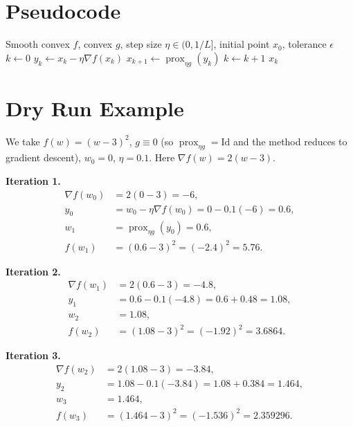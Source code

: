 \documentclass[11pt]{article}
\begin{document}
\section*{Pseudocode}

\begin{algorithm}[H]
\caption{Proximal Gradient Method}
\begin{algorithmic}[1]
\Require Smooth convex $f$, convex $g$, step size $\eta \in (0, 1/L]$, initial point $x_0$, tolerance $\epsilon$
\State $k \gets 0$
\Repeat
    \State $y_k \gets x_k - \eta \nabla f(x_k)$ 
    \State $x_{k+1} \gets \operatorname{prox}_{\eta g}(y_k)$ 
    \State $k \gets k+1$
\State \Return $x_k$
\end{algorithmic}
\end{algorithm}

\section*{Dry Run Example}

We take $f(w) = (w-3)^2$, $g \equiv 0$ (so $\operatorname{prox}_{\eta g} = \mathrm{Id}$ and the method reduces to gradient descent), $w_0 = 0$, $\eta = 0.1$. Here $\nabla f(w) = 2(w-3)$.

\textbf{Iteration 1.}
\begin{align*}
\nabla f(w_0) &= 2(0-3) = -6,\\
y_0 &= w_0 - \eta\nabla f(w_0) = 0 - 0.1(-6) = 0.6,\\
w_1 &= \operatorname{prox}_{\eta g}(y_0) = 0.6,\\
f(w_1) &= (0.6-3)^2 = (-2.4)^2 = 5.76.
\end{align*}

\textbf{Iteration 2.}
\begin{align*}
\nabla f(w_1) &= 2(0.6-3) = -4.8,\\
y_1 &= 0.6 - 0.1(-4.8) = 0.6 + 0.48 = 1.08,\\
w_2 &= 1.08,\\
f(w_2) &= (1.08-3)^2 = (-1.92)^2 = 3.6864.
\end{align*}

\textbf{Iteration 3.}
\begin{align*}
\nabla f(w_2) &= 2(1.08-3) = -3.84,\\
y_2 &= 1.08 - 0.1(-3.84) = 1.08 + 0.384 = 1.464,\\
w_3 &= 1.464,\\
f(w_3) &= (1.464-3)^2 = (-1.536)^2 = 2.359296.
\end{align*}
\end{document}

